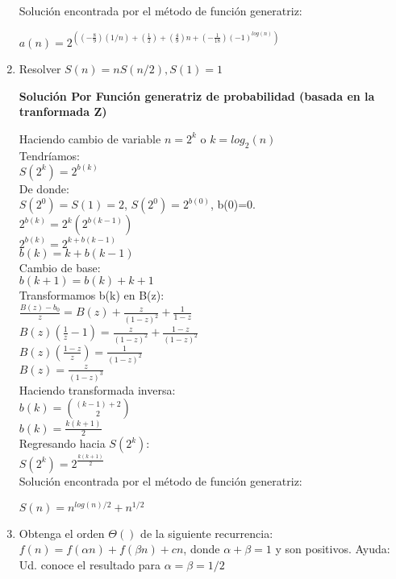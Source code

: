 \documentclass{article}
\begin{document}
\begin{enumerate}[label=\textbf{\alph*.}]
  Soluci\'on encontrada por el m\'etodo de función generatriz:
  \begin{center}
  	$a(n) = 2^{((-\frac{8}{9})(1/n)+(\frac{1}{2}) + (\frac{4}{9})n+(-\frac{1}{18})(-1)^{log(n)})}$\\
  \end{center}

  \item Resolver $S(n)=nS(n/2),S(1)=1$

    \textbf{Soluci\'on Por Funci\'on generatriz de probabilidad (basada en la tranformada Z)}
  
    Haciendo cambio de variable $n=2^k$ o $k=log_2(n)$\\
  Tendríamos:\\
  $ S(2^k)=2^{b(k)}$\\
  De donde:\\
  $S(2^0)=S(1) = 2$, $S(2^0) = 2^{b(0)}$, b(0)=0.\\
  $ 2^{b(k)} = 2^k (2^{b(k-1)})$\\
  $ 2^{b(k)} = 2^{k+b(k-1)}$\\
  $ b(k) =k+b(k-1)$\\
  Cambio de base:\\
  $ b(k+1) =b(k)+k+1$\\
  Transformamos b(k) en B(z):\\
  $\frac{B(z)-b_0}{z} = B(z) + \frac{z}{(1-z)^2}+\frac{1}{1-z}$\\
  $B(z)(\frac{1}{z}-1) = \frac{z}{(1-z)^2}+\frac{1-z}{(1-z)^2}$\\
  $B(z)(\frac{1-z}{z}) = \frac{1}{(1-z)^2}$\\
  $B(z) = \frac{z}{(1-z)^3}$\\
  Haciendo transformada inversa:\\
  $b(k) = {(k-1)+2 \choose 2}$\\
  $b(k) = \frac{k(k+1)}{2}$\\
  Regresando hacia $S(2^k)$:\\
  $S(2^k) = 2^{\frac{k(k+1)}{2}}$\\
    
  Soluci\'on encontrada por el m\'etodo de función generatriz:
  \begin{center}
  	$S(n) = n^{log(n)/2}+n^{1/2}$\\
  \end{center}

  \item Obtenga el orden $\Theta()$ de la siguiente recurrencia: $f(n)=f(\alpha n)+f(\beta n)+cn$, donde $\alpha +\beta =1$ y son positivos. Ayuda: Ud. conoce el resultado para $\alpha = \beta = 1/2$
  
\end{enumerate}
\end{document}

